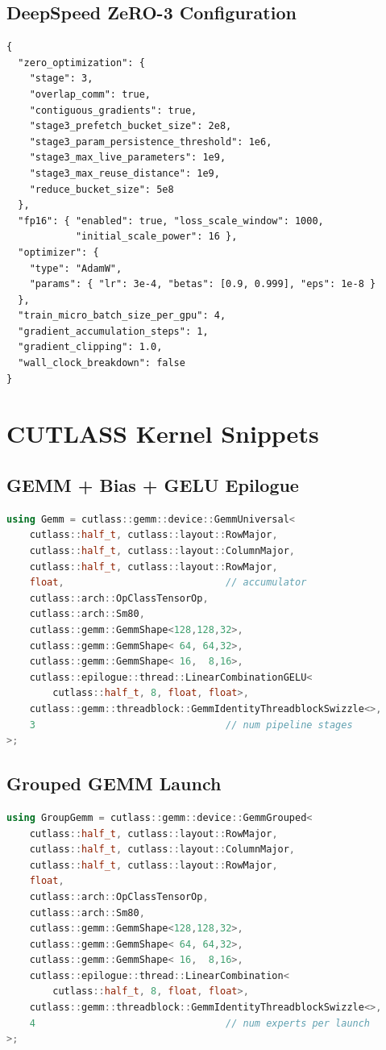 \subsection{DeepSpeed ZeRO-3 Configuration}
\begin{lstlisting}[basicstyle=\ttfamily\scriptsize]
{
  "zero_optimization": {
    "stage": 3,
    "overlap_comm": true,
    "contiguous_gradients": true,
    "stage3_prefetch_bucket_size": 2e8,
    "stage3_param_persistence_threshold": 1e6,
    "stage3_max_live_parameters": 1e9,
    "stage3_max_reuse_distance": 1e9,
    "reduce_bucket_size": 5e8
  },
  "fp16": { "enabled": true, "loss_scale_window": 1000,
            "initial_scale_power": 16 },
  "optimizer": {
    "type": "AdamW",
    "params": { "lr": 3e-4, "betas": [0.9, 0.999], "eps": 1e-8 }
  },
  "train_micro_batch_size_per_gpu": 4,
  "gradient_accumulation_steps": 1,
  "gradient_clipping": 1.0,
  "wall_clock_breakdown": false
}
\end{lstlisting}

\section{CUTLASS Kernel Snippets}\label{app:cutlass_snippets}

\subsection{GEMM + Bias + GELU Epilogue}
\begin{lstlisting}[language=C++,basicstyle=\ttfamily\scriptsize]
using Gemm = cutlass::gemm::device::GemmUniversal<
    cutlass::half_t, cutlass::layout::RowMajor,
    cutlass::half_t, cutlass::layout::ColumnMajor,
    cutlass::half_t, cutlass::layout::RowMajor,
    float,                            // accumulator
    cutlass::arch::OpClassTensorOp,
    cutlass::arch::Sm80,
    cutlass::gemm::GemmShape<128,128,32>,
    cutlass::gemm::GemmShape< 64, 64,32>,
    cutlass::gemm::GemmShape< 16,  8,16>,
    cutlass::epilogue::thread::LinearCombinationGELU<
        cutlass::half_t, 8, float, float>,
    cutlass::gemm::threadblock::GemmIdentityThreadblockSwizzle<>,
    3                                 // num pipeline stages
>;
\end{lstlisting}

\subsection{Grouped GEMM Launch}
\begin{lstlisting}[language=C++,basicstyle=\ttfamily\scriptsize]
using GroupGemm = cutlass::gemm::device::GemmGrouped<
    cutlass::half_t, cutlass::layout::RowMajor,
    cutlass::half_t, cutlass::layout::ColumnMajor,
    cutlass::half_t, cutlass::layout::RowMajor,
    float,
    cutlass::arch::OpClassTensorOp,
    cutlass::arch::Sm80,
    cutlass::gemm::GemmShape<128,128,32>,
    cutlass::gemm::GemmShape< 64, 64,32>,
    cutlass::gemm::GemmShape< 16,  8,16>,
    cutlass::epilogue::thread::LinearCombination<
        cutlass::half_t, 8, float, float>,
    cutlass::gemm::threadblock::GemmIdentityThreadblockSwizzle<>,
    4                                 // num experts per launch
>;
\end{lstlisting}

